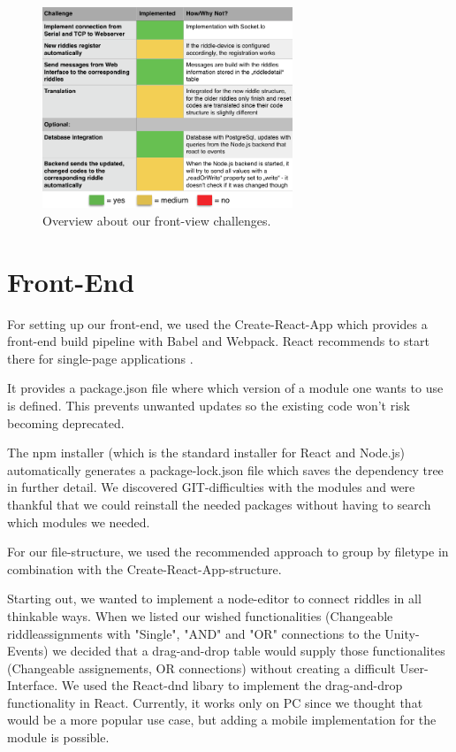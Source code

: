 \begin{figure}[th]
	\centering
	\includegraphics[width=75mm,scale=0.75]{Figures/backendOverview}
	\decoRule
	\caption[FrontViewTable]{Overview about our front-view challenges.}
	\label{fig:FrontViewTable}
\end{figure}

\section{Front-End}
For setting up our front-end, we used the Create-React-App which provides a front-end build pipeline with Babel and Webpack.
React recommends to start there for single-page applications \parencite{createReactApp}. 

It provides a package.json file where  which version of a module one wants to use is defined. 
This prevents unwanted updates so the existing code won't risk becoming deprecated.

The npm installer (which is the standard installer for React and Node.js) automatically generates a package-lock.json file which saves the dependency tree in further detail.
We discovered GIT-difficulties with the modules and were thankful that we could reinstall the needed packages without having to search which modules we needed.

For our file-structure, we used the recommended approach to group by filetype \parencite{reactStructure} in combination with the Create-React-App-structure.

Starting out, we wanted to implement a node-editor to connect riddles in all thinkable ways. 
When we listed our wished functionalities (Changeable riddleassignments with "Single", "AND" and "OR" connections to the Unity-Events) we decided that a drag-and-drop table would supply those functionalites (Changeable assignements, OR connections) without creating a difficult User-Interface.
We used the React-dnd libary \parencite{reactDND} to implement the drag-and-drop functionality in React. Currently, it works only on PC since we thought that would be a more popular use case, but adding a mobile implementation for the module is possible.

